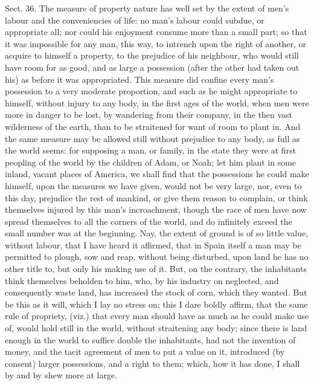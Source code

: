 \documentclass[11pt,openany]{book}
\begin{document}
Sect. 36. The measure of property nature has well set by the extent of men's labour and the conveniencies of life: no man's labour could subdue, or appropriate all; nor could his enjoyment consume more than a small part; so that it was impossible for any man, this way, to intrench upon the right of another, or acquire to himself a property, to the prejudice of his neighbour, who would still have room for as good, and as large a possession (after the other had taken out his) as before it was appropriated. This measure did confine every man's possession to a very moderate proportion, and such as he might appropriate to himself, without injury to any body, in the first ages of the world, when men were more in danger to be lost, by wandering from their company, in the then vast wilderness of the earth, than to be straitened for want of room to plant in. And the same measure may be allowed still without prejudice to any body, as full as the world seems: for supposing a man, or family, in the state they were at first peopling of the world by the children of Adam, or Noah; let him plant in some inland, vacant places of America, we shall find that the possessions he could make himself, upon the measures we have given, would not be very large, nor, even to this day, prejudice the rest of mankind, or give them reason to complain, or think themselves injured by this man's incroachment, though the race of men have now spread themselves to all the corners of the world, and do infinitely exceed the small number was at the beginning. Nay, the extent of ground is of so little value, without labour, that I have heard it affirmed, that in Spain itself a man may be permitted to plough, sow and reap, without being disturbed, upon land he has no other title to, but only his making use of it. But, on the contrary, the inhabitants think themselves beholden to him, who, by his industry on neglected, and consequently waste land, has increased the stock of corn, which they wanted. But be this as it will, which I lay no stress on; this I dare boldly affirm, that the same rule of propriety, (viz.) that every man should have as much as he could make use of, would hold still in the world, without straitening any body; since there is land enough in the world to suffice double the inhabitants, had not the invention of money, and the tacit agreement of men to put a value on it, introduced (by consent) larger possessions, and a right to them; which, how it has done, I shall by and by shew more at large.
\end{document}
